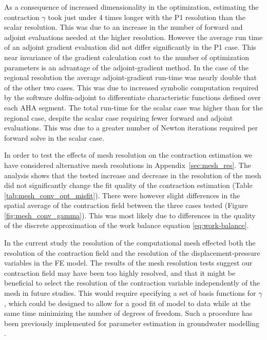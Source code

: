 As a consequence of increased dimensionality in the optimization, 
estimating the contraction $\gamma$ took just under
4 times longer with the P1 resolution than the scalar resolution.
This was due to an increase in the number of 
forward and adjoint evaluations needed at the higher resolution. 
However the average run time of an adjoint gradient evaluation
did not differ significantly in the P1 case.  This near invariance 
of the gradient calculation cost to the number of optimization 
parameters is an advantage of the adjoint-gradient
method. In the case of the regional resolution the average adjoint-gradient 
run-time was nearly double that of the other two cases.
This was due to increased symbolic computation required by the 
software dolfin-adjoint to differentiate characteristic
functions defined over each AHA segment. The total run-time for the 
scalar case was higher than for the regional case, despite the
scalar case requiring fewer forward and adjoint evaluations. This was due to 
a greater number of Newton iterations 
required per forward solve in the scalar case.

In order to test the effects of mesh resolution on the contraction estimation we have considered
alternative mesh resolutions in Appendix~\ref{sec:mesh_res}. The analysis shows that 
the tested increase and decrease
in the resolution of the mesh did not significantly change the 
fit quality of the contraction estimation (Table \ref{tab:mesh_conv_opt_misfit}).
There were however slight differences in the spatial average of the contraction field 
between the three cases tested
(Figure \ref{fig:mesh_conv_gamma}). This was most likely due to differences 
in the quality of the discrete approximation of 
the work balance equation \eqref{eq:work-balance}.


In the current study the 
resolution of the computational mesh effected both the resolution of the contraction 
field and the resolution of the displacement-pressure variables	 in the FE model.
The results of the mesh resolution tests suggest our contraction field may have
been too highly resolved, and that it might be beneficial
to select the resolution of the contraction variable independently of the mesh
in future studies. This would require specifying a set of basis functions for $\gamma$, 
which could be designed to allow for a good fit of model to data while
at the same time minimizing the number of degrees of freedom.
Such a procedure has been previously implemented for parameter 
estimation in groundwater modelling \cite{tsai2003global}.


